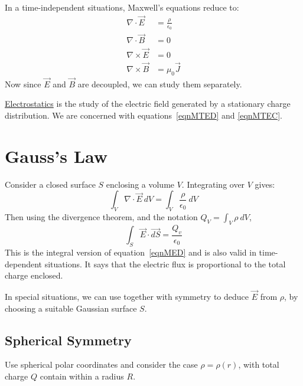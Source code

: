 \documentclass[../Main.tex]{subfiles}
\begin{document}
In a time-independent situations, Maxwell's equations reduce to:
\begin{align}
    \nabla \cdot \vec{E} &= \frac{\rho}{\epsilon_0} \label{eqnMTED} \\
    \nabla \cdot \vec{B} &= 0 \label{eqnMTBD} \\
    \nabla \times \vec{E} &= 0 \label{eqnMTEC} \\
    \nabla \times \vec{B} &= \mu_0 \vec{J} \label{eqnMTBC}
\end{align}
Now since $\vec{E}$ and $\vec{B}$ are decoupled, we can study them separately.

\underline{Electrostatics} is the study of the electric field generated by a stationary charge distribution. We are concerned with equations~\ref{eqnMTED} and \ref{eqnMTEC}.
\section{Gauss's Law}
Consider a closed surface $S$ enclosing a volume $V$. Integrating  over $V$ gives:
\begin{equation*}
    \int_V \nabla \cdot \vec{E}~dV = \int_V\frac{\rho}{\epsilon_0}~dV
\end{equation*}
Then using the divergence theorem, and the notation $Q_V = \int_V \rho~dV$,
\begin{equation}
    \int_S \vec{E} \cdot \vec{dS} = \frac{Q_v}{\epsilon_0}
    \label{eqnGaussLaw}
\end{equation}
This is the integral version of equation~\ref{eqnMED} and is also valid in time-dependent situations. It says that the electric flux is proportional to the total charge enclosed.

In special situations, we can use  together with symmetry to deduce $\vec{E}$ from $\rho$, by choosing a suitable Gaussian surface $S$.
\subsection{Spherical Symmetry}
Use spherical polar coordinates and consider the case $\rho = \rho(r)$, with total charge $Q$ contain within a radius $R$.
\end{document}

